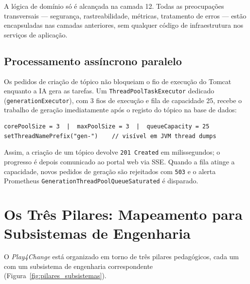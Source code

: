 A lógica de domínio só é alcançada na camada 12.
Todas as preocupações transversais — segurança, rastreabilidade, métricas,
tratamento de erros — estão encapsuladas nas camadas anteriores, sem
qualquer código de infraestrutura nos serviços de aplicação.

\subsection*{Processamento assíncrono paralelo}

Os pedidos de criação de tópico não bloqueiam o fio de execução do
Tomcat enquanto a IA gera as tarefas.
Um \texttt{ThreadPoolTaskExecutor} dedicado (\texttt{generationExecutor}),
com 3 fios de execução e fila de capacidade 25, recebe o trabalho de
geração imediatamente após o registo do tópico na base de dados:

\begin{verbatim}
corePoolSize = 3  |  maxPoolSize = 3  |  queueCapacity = 25
setThreadNamePrefix("gen-")    // visível em JVM thread dumps
\end{verbatim}

Assim, a criação de um tópico devolve \texttt{201 Created} em milissegundos;
o progresso é depois comunicado ao portal web via SSE.
Quando a fila atinge a capacidade, novos pedidos de geração são rejeitados
com \texttt{503} e o alerta Prometheus
\texttt{GenerationThreadPoolQueueSaturated} é disparado.

\section{Os Três Pilares: Mapeamento para Subsistemas de Engenharia}
\label{sec:tres_pilares}

O \textit{Play4Change} está organizado em torno de três pilares
pedagógicos, cada um com um subsistema de engenharia correspondente
(Figura~\ref{fig:pilares_subsistemas}).

